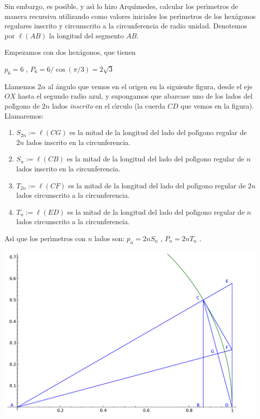 Sin embargo, es posible, y as\'{\i} lo hizo Arqu\'{\i}medes,  calcular los
per\'{\i}metros de manera recursiva utilizando como valores iniciales los
per\'{\i}metros de los hex\'agonos regulares inscrito y circunscrito a la
circunferencia de radio unidad. Denotemos por $\ell(AB)$ la longitud del
segmento $AB.$

Empezamos con  dos hex\'agonos, que tienen 

\hfil $p_6=6$ , $P_6=6/\cos(\pi/3)=2\sqrt3$

Llamemos 2$\alpha$ al \'angulo que vemos en el origen en la siguiente figura,
desde el eje $OX$ hasta el segundo radio azul, y
supongamos que abarcase uno 
de los lados del pol\'{\i}gono de $2n$ lados \emph{inscrito} en el c\'{\i}rculo
(la cuerda $CD$ que  vemos en la figura).
Llamaremos:
\begin{enumerate}
 \item $S_{2n}:=\ell(CG)$ es la mitad de la longitud del lado del pol\'{\i}gono
regular de $2n$ lados inscrito en la circunferencia.
 
 \item $S_{n}:=\ell(CB)$ es la mitad de la longitud del lado del pol\'{\i}gono
regular de $n$ lados inscrito en la circunferencia.

\item $T_{2n}:=\ell(CF)$ es la mitad de la longitud del lado del pol\'{\i}gono
regular de $2n$ lados circunscrito a la circunferencia.
 
 \item $T_{n}:=\ell(ED)$ es la mitad de la longitud del lado del pol\'{\i}gono
regular de $n$ lados circunscrito a la circunferencia.
 
\end{enumerate}

As\'{\i} que los per\'{\i}metros con $n$ lados son: $p_n=2nS_n$ , $P_n=2nT_n$ .
\begin{center}
\includegraphics[totalheight=60mm]{imagenes/pi-arqui}
\end{center}

